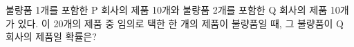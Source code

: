 불량품 1개를 포함한 P 회사의 제품 10개와 불량품 2개를 포함한 Q 회사의 제품 10개가 있다. 이 20개의 제품 중 임의로 택한 한 개의 제품이 불량품일 때, 그 불량품이 Q 회사의 제품일 확률은?
